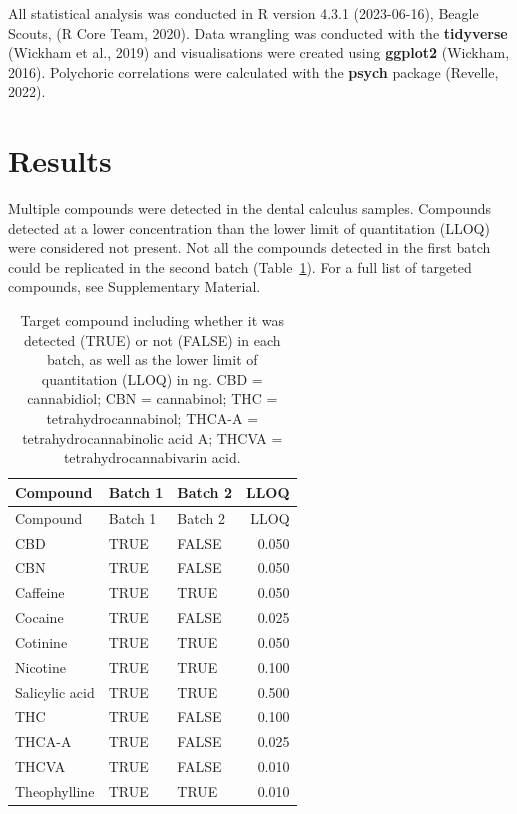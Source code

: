 \documentclass[
]{article}
\begin{document}
All statistical analysis was conducted in R version 4.3.1 (2023-06-16),
Beagle Scouts, (R Core Team, 2020). Data wrangling was conducted with
the \textbf{tidyverse} (Wickham et al., 2019) and visualisations were
created using \textbf{ggplot2} (Wickham, 2016). Polychoric correlations
were calculated with the \textbf{psych} package (Revelle, 2022).

\hypertarget{results}{%
\section{Results}\label{results}}

Multiple compounds were detected in the dental calculus samples.
Compounds detected at a lower concentration than the lower limit of
quantitation (LLOQ) were considered not present. Not all the compounds
detected in the first batch could be replicated in the second batch
(Table~\ref{tbl-compound-detect}). For a full list of targeted
compounds, see Supplementary Material.

\hypertarget{tbl-compound-detect}{}
\begin{longtable}[]{@{}lllr@{}}
\caption{\label{tbl-compound-detect}Target compound including whether it
was detected (TRUE) or not (FALSE) in each batch, as well as the lower
limit of quantitation (LLOQ) in ng. CBD = cannabidiol; CBN = cannabinol;
THC = tetrahydrocannabinol; THCA-A = tetrahydrocannabinolic acid A;
THCVA = tetrahydrocannabivarin acid.}\tabularnewline
\toprule\noalign{}
Compound & Batch 1 & Batch 2 & LLOQ \\
\midrule\noalign{}
\endfirsthead
\toprule\noalign{}
Compound & Batch 1 & Batch 2 & LLOQ \\
\midrule\noalign{}
\endhead
\bottomrule\noalign{}
\endlastfoot
CBD & TRUE & FALSE & 0.050 \\
CBN & TRUE & FALSE & 0.050 \\
Caffeine & TRUE & TRUE & 0.050 \\
Cocaine & TRUE & FALSE & 0.025 \\
Cotinine & TRUE & TRUE & 0.050 \\
Nicotine & TRUE & TRUE & 0.100 \\
Salicylic acid & TRUE & TRUE & 0.500 \\
THC & TRUE & FALSE & 0.100 \\
THCA-A & TRUE & FALSE & 0.025 \\
THCVA & TRUE & FALSE & 0.010 \\
Theophylline & TRUE & TRUE & 0.010 \\
\end{longtable}
\end{document}
